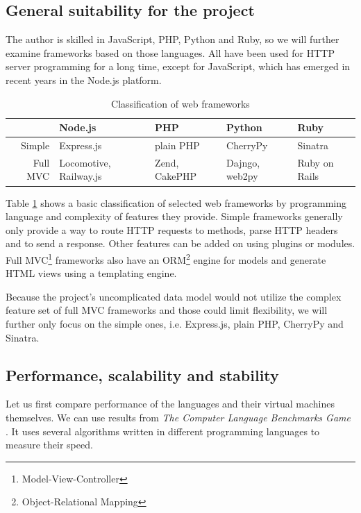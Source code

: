 \documentclass[12pt,oneside]{fithesis}
\begin{document}
	\subsection{General suitability for the project}
		The author is skilled in JavaScript, PHP, Python and Ruby, so we will further examine frameworks based on those languages. All have been used for HTTP server programming for a long time, except for JavaScript, which has emerged in recent years in the Node.js platform.\\
		\begin{table}[htb]
		\begin{tabular}{|r||p{2.2cm}|p{2.2cm}|p{2.1cm}|p{2.2cm}|}
			\hline 
			\rule[-1ex]{0pt}{2.5ex} & Node.js & PHP & Python & Ruby \\ 
			\hline\hline
			\rule[-1ex]{0pt}{2.5ex} Simple & Express.js & plain PHP & CherryPy & Sinatra \\ 
			\hline 
			\rule[-1ex]{0pt}{2.5ex} Full MVC & Locomotive, Railway.js & Zend, CakePHP & Dajngo, web2py & Ruby on Rails \\ 
			\hline 
		\end{tabular}
		\caption{Classification of web frameworks}
		\label{table:wf}
		\end{table}
	
		Table \ref{table:wf} shows a basic classification of selected web frameworks by programming language and complexity of features they provide. Simple frameworks generally only provide a way to route HTTP requests to methods, parse HTTP headers and to send a response. Other features can be added on using plugins or modules. Full MVC\footnote{Model-View-Controller} frameworks also have an ORM\footnote{Object-Relational Mapping} engine for models and generate HTML views using a templating engine.
		
		Because the project's uncomplicated data model would not utilize the complex feature set of full MVC frameworks and those could limit flexibility, we will further only focus on the simple ones, i.e. Express.js, plain PHP, CherryPy and Sinatra.
		
	\subsection{Performance, scalability and stability}
		Let us first compare performance of the languages and their virtual machines themselves. We can use results from \emph{The Computer Language Benchmarks Game} \cite{website:bench}. It uses several algorithms written in different programming languages to measure their speed.
		
\end{document}
